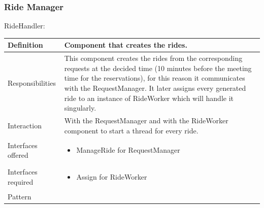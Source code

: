 \documentclass[a4paper,11pt]{report} %
\begin{document}
	\subsubsection{Ride Manager}
	\begin{minipage}{\linewidth}
	\end{minipage} \linebreak
	\centerline{RideHandler:}
	\begin{center}
		\begin{tabular}{| l | p{9cm} |}\hline
			Definition & Component that creates the rides.\\\hline
			Responsibilities & This component creates the rides from the corresponding requests at the decided time (10 minutes before the meeting time for the reservations), for this reason it communicates with the RequestManager. It later assigns every generated ride to an instance of RideWorker which will handle it singularly.\\\hline
			Interaction & With the RequestManager and with the RideWorker component to start a thread for every ride.\\\hline
			Interfaces offered & \begin{itemize}
				\item ManageRide for RequestManager
			\end{itemize}\\\hline
			Interfaces required & \begin{itemize}
				\item Assign for RideWorker
			\end{itemize}\\\hline
			Pattern & \\\hline
		\end{tabular}
	\end{center}
	
\end{document}
